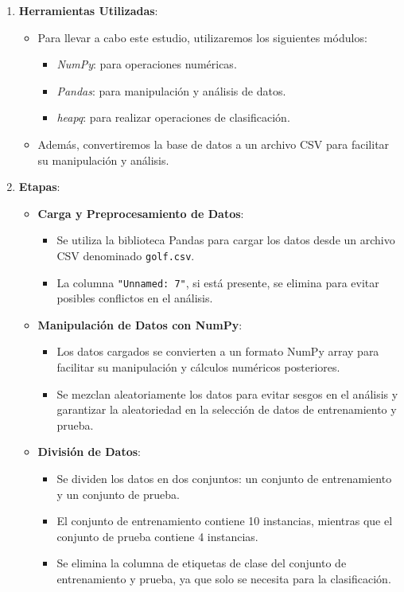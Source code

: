 \begin{enumerate}
    \item \textbf{Herramientas Utilizadas}:
    \begin{itemize}
        \item Para llevar a cabo este estudio, utilizaremos los siguientes módulos:
        \begin{itemize}
            \item \textit{NumPy}: para operaciones numéricas.
            \item \textit{Pandas}: para manipulación y análisis de datos.
            \item \textit{heapq}: para realizar operaciones de clasificación.
        \end{itemize}
        \item Además, convertiremos la base de datos a un archivo CSV para facilitar su manipulación y análisis.
    \end{itemize}


    \item \textbf{Etapas}:
    \begin{itemize}

        \item \textbf{Carga y Preprocesamiento de Datos}:
        \begin{itemize}
            \item Se utiliza la biblioteca Pandas para cargar los datos desde un archivo CSV denominado \texttt{golf.csv}.
            \item La columna \texttt{"Unnamed: 7"}, si está presente, se elimina para evitar posibles conflictos en el análisis.
        \end{itemize}

        \item \textbf{Manipulación de Datos con NumPy}:
        \begin{itemize}
            \item Los datos cargados se convierten a un formato NumPy array para facilitar su manipulación y cálculos numéricos posteriores.
            \item Se mezclan aleatoriamente los datos para evitar sesgos en el análisis y garantizar la aleatoriedad en la selección de datos de entrenamiento y prueba.
        \end{itemize}

        \item \textbf{División de Datos}:
        \begin{itemize}
            \item Se dividen los datos en dos conjuntos: un conjunto de entrenamiento y un conjunto de prueba.
            \item El conjunto de entrenamiento contiene 10 instancias, mientras que el conjunto de prueba contiene 4 instancias.
            \item Se elimina la columna de etiquetas de clase del conjunto de entrenamiento y prueba, ya que solo se necesita para la clasificación.
        \end{itemize}


\end{itemize}
\end{enumerate}
